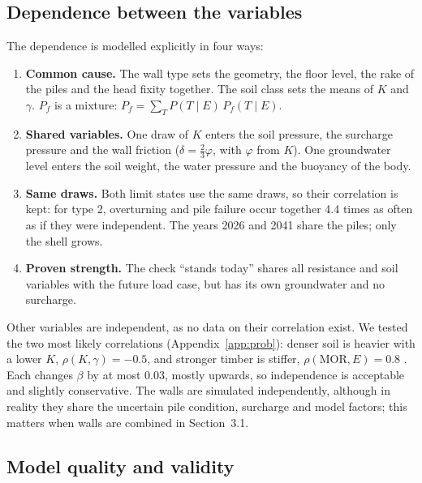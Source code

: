 \subsection{Dependence between the variables}\label{sec:prob-dependence}

The dependence is modelled explicitly in four ways:
\begin{enumerate}\setlength{\itemsep}{0pt}\setlength{\parskip}{0pt}
  \item \textbf{Common cause.} The wall type sets the geometry, the floor
    level, the rake of the piles and the head fixity together. The soil class
    sets the means of $K$ and $\gamma$. $P_f$ is a mixture:
    $P_f = \sum_T P(T \mid E)\,P_f(T \mid E)$.
  \item \textbf{Shared variables.} One draw of $K$ enters the soil pressure,
    the surcharge pressure and the wall friction ($\delta = \tfrac23\varphi$,
    with $\varphi$ from $K$). One groundwater level enters the soil weight,
    the water pressure and the buoyancy of the body.
  \item \textbf{Same draws.} Both limit states use the same draws, so their
    correlation is kept: for type 2, overturning and pile failure occur
    together 4.4 times as often as if they were independent. The years 2026
    and 2041 share the piles; only the shell grows.
  \item \textbf{Proven strength.} The check ``stands today'' shares all
    resistance and soil variables with the future load case, but has its own
    groundwater and no surcharge.
\end{enumerate}
Other variables are independent, as no data on their correlation exist. We
tested the two most likely correlations (Appendix~\ref{app:prob}): denser
soil is heavier with a lower $K$, $\rho(K,\gamma) = -0.5$, and stronger timber
is stiffer, $\rho(\text{MOR}, E) = 0.8$ \cite{jcss2001}. Each changes $\beta$
by at most 0.03, mostly upwards, so independence is acceptable and slightly
conservative. The walls are simulated independently, although in reality
they share the uncertain pile condition, surcharge and model factors; this
matters when walls are combined in Section~3.1.

\subsection{Model quality and validity}\label{sec:prob-validity}

